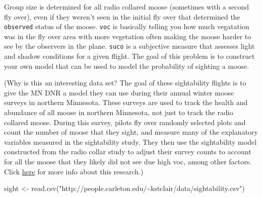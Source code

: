 \documentclass[
]{article}
\newenvironment{Shaded}{\begin{snugshade}}{\end{snugshade}}
\newcommand{\FunctionTok}[1]{\textcolor[rgb]{0.00,0.00,0.00}{#1}}
\newcommand{\NormalTok}[1]{#1}
\newcommand{\OtherTok}[1]{\textcolor[rgb]{0.56,0.35,0.01}{#1}}
\newcommand{\StringTok}[1]{\textcolor[rgb]{0.31,0.60,0.02}{#1}}
\begin{document}
Group size is determined for all radio collared moose (sometimes with a
second fly over), even if they weren't seen in the initial fly over that
determined the \texttt{observed} status of the moose. \texttt{voc} is
basically telling you how much vegatation was in the fly over area with
more vegetation often making the moose harder to see by the observers in
the plane. \texttt{suco} is a subjective measure that assesses light and
shadow conditions for a given flight. The goal of this problem is to
construct your own model that can be used to model the probability of
sighting a moose.

(Why is this an interesting data set? The goal of these sightability
flights is to give the MN DNR a model they can use during their annual
winter moose surveys in northern Minnesota. These surveys are used to
track the health and abundance of all moose in northern Minnesota, not
just to track the radio collared moose. During this survey, pilots fly
over randomly selected plots and count the number of moose that they
sight, and measure many of the explanatory variables measured in the
sightability study. They then use the sightability model constructed
from the radio collar study to adjust their survey counts to account for
all the moose that they likely did not see due high voc, among other
factors. Click \href{http://www.dnr.state.mn.us/moose/index.html}{here}
for more info about this research.)

\begin{Shaded}
\begin{Highlighting}[]
\NormalTok{sight }\OtherTok{\textless{}{-}} \FunctionTok{read.csv}\NormalTok{(}\StringTok{"http://people.carleton.edu/\textasciitilde{}kstclair/data/sightability.csv"}\NormalTok{)}
\end{Highlighting}
\end{Shaded}
\end{document}
